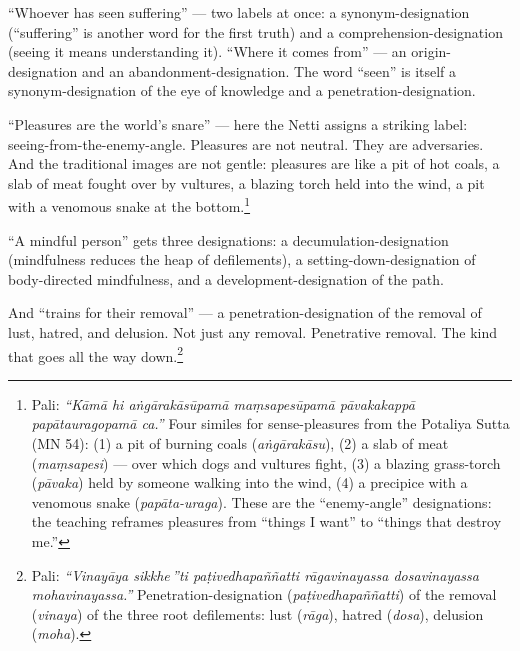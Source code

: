 ``Whoever has seen suffering'' --- two labels at once: a synonym-designation (``suffering'' is another word for the first truth) and a comprehension-designation (seeing it means understanding it). ``Where it comes from'' --- an origin-designation and an abandonment-designation. The word ``seen'' is itself a synonym-designation of the eye of knowledge and a penetration-designation.

``Pleasures are the world's snare'' --- here the Netti assigns a striking label: seeing-from-the-enemy-angle. Pleasures are not neutral. They are adversaries. And the traditional images are not gentle: pleasures are like a pit of hot coals, a slab of meat fought over by vultures, a blazing torch held into the wind, a pit with a venomous snake at the bottom.\footnote{Pali: \textit{``Kāmā hi aṅgārakāsūpamā maṃsapesūpamā pāvakakappā papātauragopamā ca.''} Four similes for sense-pleasures from the Potaliya Sutta (MN 54): (1) a pit of burning coals (\textit{aṅgārakāsu}), (2) a slab of meat (\textit{maṃsapesi}) --- over which dogs and vultures fight, (3) a blazing grass-torch (\textit{pāvaka}) held by someone walking into the wind, (4) a precipice with a venomous snake (\textit{papāta-uraga}). These are the ``enemy-angle'' designations: the teaching reframes pleasures from ``things I want'' to ``things that destroy me.''}

``A mindful person'' gets three designations: a decumulation-designation (mindfulness reduces the heap of defilements), a setting-down-designation of body-directed mindfulness, and a development-designation of the path.

And ``trains for their removal'' --- a penetration-designation of the removal of lust, hatred, and delusion. Not just any removal. Penetrative removal. The kind that goes all the way down.\footnote{Pali: \textit{``Vinayāya sikkhe\,''ti paṭivedhapaññatti rāgavinayassa dosavinayassa mohavinayassa.''} Penetration-designation (\textit{paṭivedhapaññatti}) of the removal (\textit{vinaya}) of the three root defilements: lust (\textit{rāga}), hatred (\textit{dosa}), delusion (\textit{moha}).}


